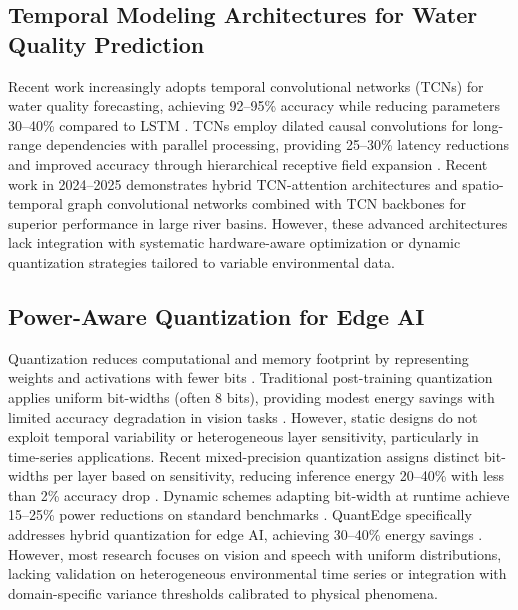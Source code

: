 \documentclass[12pt,a4paper]{article}
\begin{document}
\subsection{Temporal Modeling Architectures for Water Quality Prediction}

Recent work increasingly adopts temporal convolutional networks (TCNs) for water quality forecasting, achieving 92--95\% accuracy while reducing parameters 30--40\% compared to LSTM \citep{lin2021tcan, luo2024moderntcn, chen2020prob}. TCNs employ dilated causal convolutions for long-range dependencies with parallel processing, providing 25--30\% latency reductions and improved accuracy through hierarchical receptive field expansion \citep{lin2021tcan, luo2024moderntcn}. Recent work in 2024--2025 demonstrates hybrid TCN-attention architectures \citep{luo2024moderntcn} and spatio-temporal graph convolutional networks combined with TCN backbones \citep{lin2021tcan} for superior performance in large river basins. However, these advanced architectures lack integration with systematic hardware-aware optimization or dynamic quantization strategies tailored to variable environmental data.

\subsection{Power-Aware Quantization for Edge AI}

Quantization reduces computational and memory footprint by representing weights and activations with fewer bits \citep{gholami2021quant}. Traditional post-training quantization applies uniform bit-widths (often 8 bits), providing modest energy savings with limited accuracy degradation in vision tasks \citep{frantar2023gptq, dettmers2022llmint8}. However, static designs do not exploit temporal variability or heterogeneous layer sensitivity, particularly in time-series applications. Recent mixed-precision quantization assigns distinct bit-widths per layer based on sensitivity, reducing inference energy 20--40\% with less than 2\% accuracy drop \citep{rakka2024mixedapprox, liu2025lowbit, wandb2025qat}. Dynamic schemes adapting bit-width at runtime achieve 15--25\% power reductions on standard benchmarks \citep{liu2025lowbit, forhad2024iot}. QuantEdge specifically addresses hybrid quantization for edge AI, achieving 30--40\% energy savings \citep{motetti2024joint}. However, most research focuses on vision and speech with uniform distributions, lacking validation on heterogeneous environmental time series or integration with domain-specific variance thresholds calibrated to physical phenomena.
\end{document}
